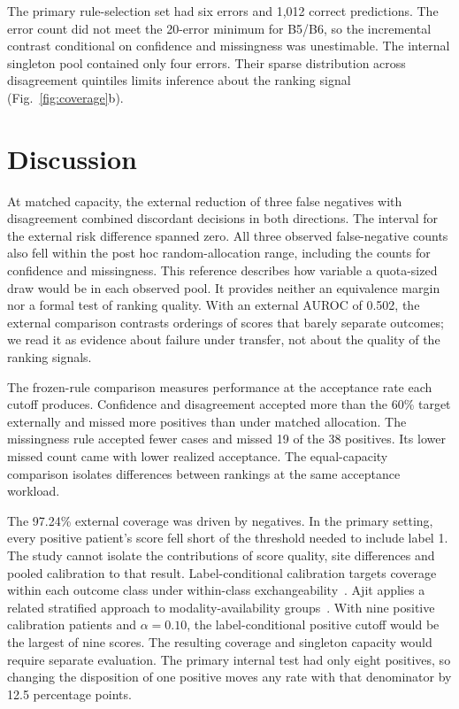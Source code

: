 \documentclass[conference]{IEEEtran}
\begin{document}
The primary rule-selection set had six errors and 1,012 correct predictions. The error count did not meet the 20-error minimum for B5/B6, so the incremental contrast conditional on confidence and missingness was unestimable. The internal singleton pool contained only four errors. Their sparse distribution across disagreement quintiles limits inference about the ranking signal (Fig.~\ref{fig:coverage}b).

\section{Discussion}

At matched capacity, the external reduction of three false negatives with disagreement combined discordant decisions in both directions. The interval for the external risk difference spanned zero. All three observed false-negative counts also fell within the post hoc random-allocation range, including the counts for confidence and missingness. This reference describes how variable a quota-sized draw would be in each observed pool. It provides neither an equivalence margin nor a formal test of ranking quality. With an external AUROC of 0.502, the external comparison contrasts orderings of scores that barely separate outcomes; we read it as evidence about failure under transfer, not about the quality of the ranking signals.

The frozen-rule comparison measures performance at the acceptance rate each cutoff produces. Confidence and disagreement accepted more than the 60\% target externally and missed more positives than under matched allocation. The missingness rule accepted fewer cases and missed 19 of the 38 positives. Its lower missed count came with lower realized acceptance. The equal-capacity comparison isolates differences between rankings at the same acceptance workload.

The 97.24\% external coverage was driven by negatives. In the primary setting, every positive patient's score fell short of the threshold needed to include label 1. The study cannot isolate the contributions of score quality, site differences and pooled calibration to that result. Label-conditional calibration targets coverage within each outcome class under within-class exchangeability~\cite{sadinle2019}. Ajit applies a related stratified approach to modality-availability groups~\cite{ajit2026}. With nine positive calibration patients and $\alpha = 0.10$, the label-conditional positive cutoff would be the largest of nine scores. The resulting coverage and singleton capacity would require separate evaluation. The primary internal test had only eight positives, so changing the disposition of one positive moves any rate with that denominator by 12.5 percentage points.
\end{document}
